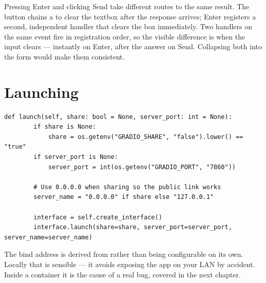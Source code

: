 Pressing Enter and clicking Send take different routes to the same result. The button chains a  to clear the textbox after the response arrives; Enter registers a second, independent  handler that clears the box immediately. Two handlers on the same event fire in registration order, so the visible difference is when the input clears --- instantly on Enter, after the answer on Send. Collapsing both into the  form would make them consistent.

\section{Launching}

\begin{lstlisting}[style=py,firstnumber=154]
    def launch(self, share: bool = None, server_port: int = None):
        if share is None:
            share = os.getenv("GRADIO_SHARE", "false").lower() == "true"
        if server_port is None:
            server_port = int(os.getenv("GRADIO_PORT", "7860"))

        # Use 0.0.0.0 when sharing so the public link works
        server_name = "0.0.0.0" if share else "127.0.0.1"

        interface = self.create_interface()
        interface.launch(share=share, server_port=server_port, server_name=server_name)
\end{lstlisting}

The bind address is derived from  rather than being configurable on its own. Locally that is sensible --- it avoids exposing the app on your LAN by accident. Inside a container it is the cause of a real bug, covered in the next chapter.
